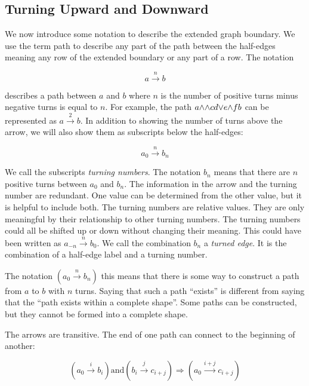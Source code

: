 \documentclass[acmtog]{acmart}
\begin{document}
\subsection{Turning Upward and Downward}
\label{turning upward}

We now introduce some notation to describe the extended graph boundary. We use
the term path to describe any part of the path between the half-edges meaning
any row of the extended boundary or any part of a row. The notation

\begin{equation}
a \xrightarrow{n} b
\end{equation}

\noindent describes a path between $a$ and $b$ where $n$ is the number of positive turns
minus negative turns is equal to $n$. For example, the path
$a {\wedge} {\wedge} c d {\vee} e {\wedge} f b$ can be represented as $a \xrightarrow{2} b$. In
addition to showing the number of turns above the arrow, we will also show them
as subscripts below the half-edges:

\begin{equation}
a_0 \xrightarrow{n} b_n
\end{equation}

We call the subscripts \textit{turning numbers}. The notation $b_n$ means that 
there are $n$ positive turns between $a_0$ and $b_n$. The information in the arrow and 
the turning number are redundant. One value can be determined from the other 
value, but it is helpful to include both. The turning numbers are relative 
values. They are only meaningful by their relationship to other turning numbers.
The turning numbers could all be shifted up or down without changing their meaning. This could have 
been written as $a_{-n} \xrightarrow{n} b_0$. We call the combination $b_n$ a
\textit{turned edge}. It is the combination of a half-edge label and a turning number.

The notation $\left(a_0 \xrightarrow{n} b_n\right)$ this means that there is some way
to construct a path from $a$ to $b$ with $n$ turns. Saying that such a path
``exists'' is different from saying that the ``path exists within a complete
shape''. Some paths can be constructed, but they cannot be formed into a
complete shape.

The arrows are transitive. The end of one path can connect to the beginning of
another:

\begin{equation}
\left(a_0 \xrightarrow{i} b_i \right) \textrm{and} \left(b_i \xrightarrow{j} c_{i+j}\right) \Rightarrow \left(a_0 \xrightarrow{i+j} c_{i+j}\right)
\end{equation}
\end{document}
